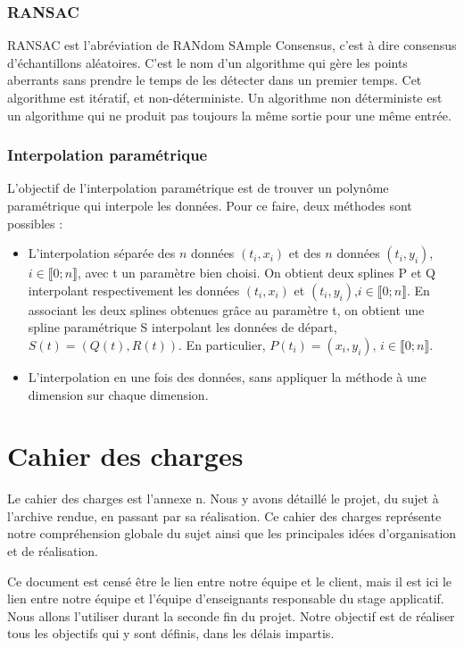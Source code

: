 \documentclass[a4paper,12pt]{article} %
\begin{document}
\subsubsection*{RANSAC}

RANSAC est l'abréviation de RANdom SAmple Consensus, c'est à dire consensus d'échantillons aléatoires. C'est le nom d'un algorithme qui gère les points aberrants sans prendre le temps de les détecter dans un premier temps. Cet algorithme est itératif, et non-déterministe. Un algorithme non déterministe est un algorithme qui ne produit pas toujours la même sortie pour une même entrée.

\subsubsection*{Interpolation paramétrique}

L'objectif de l'interpolation paramétrique est de trouver un polynôme paramétrique qui interpole les données. Pour ce faire, deux méthodes sont possibles :
\begin{itemize}
\item L'interpolation séparée des $n$ données $(t_i,x_i)$ et des $n$ données $(t_i,y_i)$, $i\in\llbracket 0; n \rrbracket$, avec t un paramètre bien choisi. On obtient deux splines P et Q interpolant respectivement les données $(t_i,x_i)$ et $(t_i,y_i)$,$i\in\llbracket 0; n \rrbracket$. En associant les deux splines obtenues grâce au paramètre t, on obtient une spline paramétrique S interpolant les données de départ, $S(t) = (Q(t),R(t))$. En particulier, $P(t_i) = (x_i,y_i)$, $i\in\llbracket 0; n \rrbracket$.
\item L'interpolation en une fois des données, sans appliquer la méthode à une dimension sur chaque dimension.
\end{itemize}


\section{Cahier des charges}

Le cahier des charges est l'annexe n. Nous y avons détaillé le projet, du sujet à l'archive rendue, en passant par sa réalisation. Ce cahier des charges représente notre compréhension globale du sujet ainsi que les principales idées d'organisation et de réalisation.

Ce document est censé être le lien entre notre équipe et le client, mais il est ici le lien entre notre équipe et l'équipe d'enseignants responsable du stage applicatif. Nous allons l'utiliser durant la seconde fin du projet. Notre objectif est de réaliser tous les objectifs qui y sont définis, dans les délais impartis.
\end{document}
